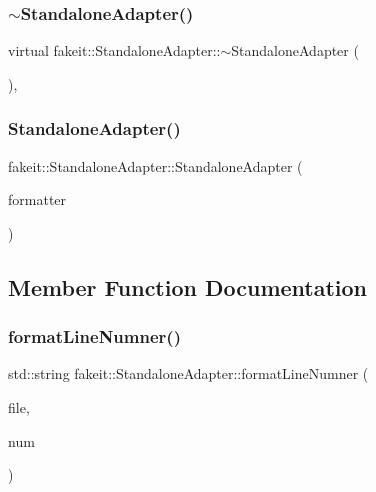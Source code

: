 \subsubsection{\texorpdfstring{$\sim$StandaloneAdapter()}{~StandaloneAdapter()}\hspace{0.1cm}{\footnotesize\ttfamily [2/2]}}
{\footnotesize\ttfamily virtual fakeit\+::\+Standalone\+Adapter\+::$\sim$\+Standalone\+Adapter (\begin{DoxyParamCaption}{ }\end{DoxyParamCaption})\hspace{0.3cm}{\ttfamily [virtual]}, {\ttfamily [default]}}

\mbox{\label{structfakeit_1_1StandaloneAdapter_a3a836d2ff78bb811a96c4cc3228f5f37}} 
\subsubsection{\texorpdfstring{StandaloneAdapter()}{StandaloneAdapter()}\hspace{0.1cm}{\footnotesize\ttfamily [2/2]}}
{\footnotesize\ttfamily fakeit\+::\+Standalone\+Adapter\+::\+Standalone\+Adapter (\begin{DoxyParamCaption}\item[{\mbox{\hyperlink{structfakeit_1_1EventFormatter}{Event\+Formatter}} \&}]{formatter }\end{DoxyParamCaption})\hspace{0.3cm}{\ttfamily [inline]}}



\subsection{Member Function Documentation}
\mbox{\label{structfakeit_1_1StandaloneAdapter_a0d04fda6d7cc203d160b950df47fa284}} 
\subsubsection{\texorpdfstring{formatLineNumner()}{formatLineNumner()}\hspace{0.1cm}{\footnotesize\ttfamily [1/2]}}
{\footnotesize\ttfamily std\+::string fakeit\+::\+Standalone\+Adapter\+::format\+Line\+Numner (\begin{DoxyParamCaption}\item[{std\+::string}]{file,  }\item[{int}]{num }\end{DoxyParamCaption})\hspace{0.3cm}{\ttfamily [inline]}}

